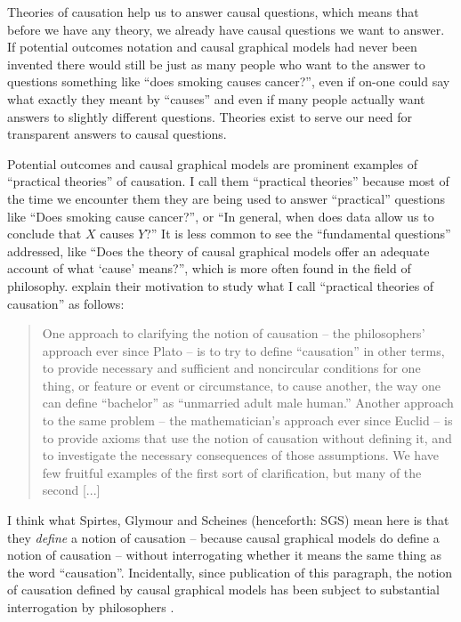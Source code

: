 Theories of causation help us to answer causal questions, which means that before we have any theory, we already have causal questions we want to answer. If potential outcomes notation and causal graphical models had never been invented there would still be just as many people who want to the answer to questions something like ``does smoking causes cancer?'', even if on-one could say what exactly they meant by ``causes'' and even if many people actually want answers to slightly different questions. Theories exist to serve our need for transparent answers to causal questions.

Potential outcomes and causal graphical models are prominent examples of ``practical theories'' of causation. I call them ``practical theories'' because most of the time we encounter them they are being used to answer ``practical'' questions like ``Does smoking cause cancer?'', or ``In general, when does data allow us to conclude that $X$ causes $Y$?'' It is less common to see the ``fundamental questions'' addressed, like ``Does the theory of causal graphical models offer an adequate account of what `cause' means?'', which is more often found in the field of philosophy. \citet{spirtes_causation_1993} explain their motivation to study what I call ``practical theories of causation'' as follows:

\begin{quote}
One approach to clarifying the notion of causation -- the philosophers’ approach ever since Plato -- is to try to define ``causation'' in other terms, to provide necessary and sufficient and noncircular conditions for one thing, or feature or event or circumstance, to cause another, the way one can define ``bachelor'' as ``unmarried adult male human.'' Another approach to the same problem -- the mathematician’s approach ever since Euclid -- is to provide axioms that use the notion of causation without defining it, and to investigate the necessary consequences of those assumptions. We have few fruitful examples of the first sort of clarification, but many of the second [...]
\end{quote}

I think what Spirtes, Glymour and Scheines (henceforth: SGS) mean here is that they \emph{define} a notion of causation -- because causal graphical models do define a notion of causation -- without interrogating whether it means the same thing as the word ``causation''. Incidentally, since publication of this paragraph, the notion of causation defined by causal graphical models has been subject to substantial interrogation by philosophers \citep{woodward_causation_2016}.

